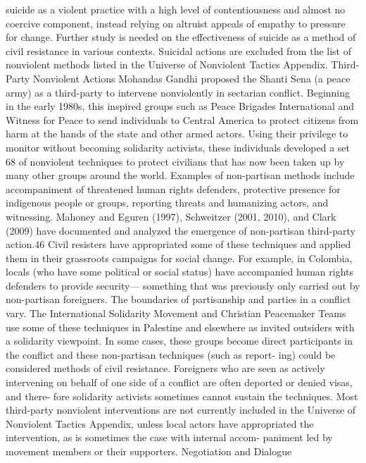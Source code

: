 \documentclass[twoside,a4paper,12pt,fleqn,openany]{extbook}
\begin{document}
suicide as a violent practice with a high level of contentiousness and almost no coercive
component, instead relying on altruist appeals of empathy to pressure for change. Further
study is needed on the effectiveness of suicide as a method of civil resistance in various
contexts. Suicidal actions are excluded from the list of nonviolent methods listed in the
Universe of Nonviolent Tactics Appendix.
Third-Party Nonviolent Actions
Mohandas Gandhi proposed the Shanti Sena (a peace army) as a third-party to intervene
nonviolently in sectarian conflict. Beginning in the early 1980s, this inspired groups such as
Peace Brigades International and Witness for Peace to send individuals to Central America
to protect citizens from harm at the hands of the state and other armed actors. Using their
privilege to monitor without becoming solidarity activists, these individuals developed a set
68
of nonviolent techniques to protect civilians that has now been taken up by many other
groups around the world.
Examples of non-partisan methods include accompaniment of threatened human rights
defenders, protective presence for indigenous people or groups, reporting threats and
humanizing actors, and witnessing. Mahoney and Eguren (1997), Schweitzer (2001, 2010), and
Clark (2009) have documented and analyzed the emergence of non-partisan third-party
action.46 Civil resisters have appropriated some of these techniques and applied them in their
grassroots campaigns for social change. For example, in Colombia, locals (who have some
political or social status) have accompanied human rights defenders to provide security—
something that was previously only carried out by non-partisan foreigners.
The boundaries of partisanship and parties in a conflict vary. The International Solidarity
Movement and Christian Peacemaker Teams use some of these techniques in Palestine and
elsewhere as invited outsiders with a solidarity viewpoint. In some cases, these groups
become direct participants in the conflict and these non-partisan techniques (such as report-
ing) could be considered methods of civil resistance. Foreigners who are seen as actively
intervening on behalf of one side of a conflict are often deported or denied visas, and there-
fore solidarity activists sometimes cannot sustain the techniques. Most third-party nonviolent
interventions are not currently included in the Universe of Nonviolent Tactics Appendix, unless
local actors have appropriated the intervention, as is sometimes the case with internal accom-
paniment led by movement members or their supporters.
Negotiation and Dialogue
\end{document}
